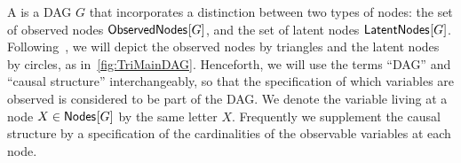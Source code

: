 A  is a DAG $G$ that incorporates a distinction between two types of nodes: the set of observed nodes ${\operatorname{\mathsf{ObservedNodes}}_{}}\lbrack G\rbrack$, and the set of latent nodes ${\operatorname{\mathsf{LatentNodes}}_{}}\lbrack G\rbrack$.  %
Following~\cite{pusey2014gdag}, we will depict the observed nodes by triangles and the latent nodes by circles, as in~\cref{fig:TriMainDAG}.
Henceforth, we will use the terms ``DAG'' and ``causal structure'' interchangeably, so that the specification of which variables are observed is considered to be part of the DAG.
We denote the variable living at a node $X\in{\operatorname{\mathsf{Nodes}}_{}}\lbrack G\rbrack$ by the same letter $X$. Frequently we supplement the causal structure by a specification of the cardinalities of the observable variables at each node.


